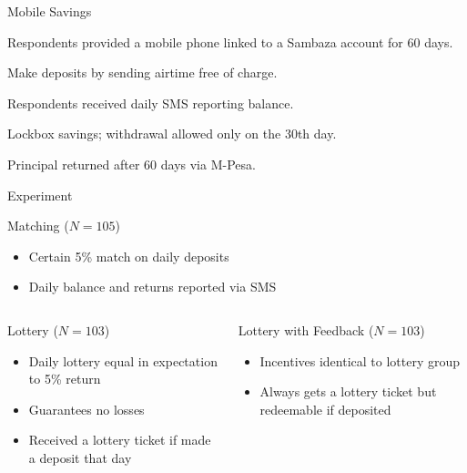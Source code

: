 \documentclass[aspectratio=169]{beamer}
\newenvironment{wideitemize}{\itemize\addtolength{\itemsep}{10pt}}{\enditemize}
\begin{document}
\begin{frame}{Mobile Savings}
	
	\begin{wideitemize}
		\item Respondents provided a mobile phone linked to a Sambaza account for 60 days.
		\item Make deposits by sending airtime free of charge.
		\item Respondents received daily SMS reporting balance.
		\item Lockbox savings; withdrawal allowed only on the 30th day.
		\item Principal returned after 60 days via M-Pesa.
	\end{wideitemize}


\end{frame}

\begin{frame}{Experiment}

	\begin{block}{Matching ($N = 105$)}
		\begin{itemize}
		\item Certain 5\% match on daily deposits
		\item Daily balance and returns reported via SMS
		\end{itemize}
	\end{block}

	\begin{columns}[T]

		\begin{column}{0.48\textwidth}
			\begin{block}{Lottery ($N = 103$)}
			\begin{itemize}
			\item Daily lottery equal in expectation to 5\% return
			\item Guarantees no losses
			\item Received a lottery ticket if made a deposit that day
			\end{itemize}
			\end{block}
		\end{column}

		\begin{column}{0.48\textwidth}
			\begin{block}{Lottery with Feedback ($N = 103$)}
			\begin{itemize}
			\item Incentives identical to lottery group
			\item Always gets a lottery ticket but redeemable if deposited
			\end{itemize}
			\end{block}
		\end{column}

	\end{columns}

\end{frame}
\end{document}
